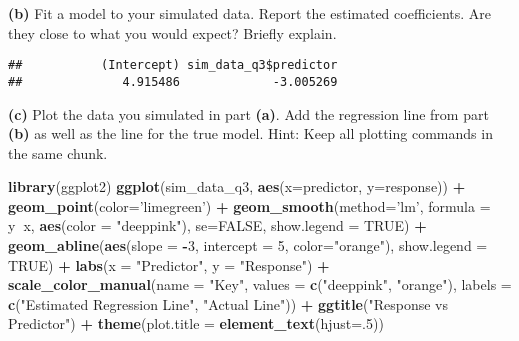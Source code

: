 \documentclass[]{article}
\newenvironment{Shaded}{\begin{snugshade}}{\end{snugshade}}
\newcommand{\KeywordTok}[1]{\textcolor[rgb]{0.13,0.29,0.53}{\textbf{#1}}}
\newcommand{\DataTypeTok}[1]{\textcolor[rgb]{0.13,0.29,0.53}{#1}}
\newcommand{\DecValTok}[1]{\textcolor[rgb]{0.00,0.00,0.81}{#1}}
\newcommand{\StringTok}[1]{\textcolor[rgb]{0.31,0.60,0.02}{#1}}
\newcommand{\OtherTok}[1]{\textcolor[rgb]{0.56,0.35,0.01}{#1}}
\newcommand{\OperatorTok}[1]{\textcolor[rgb]{0.81,0.36,0.00}{\textbf{#1}}}
\newcommand{\NormalTok}[1]{#1}
\begin{document}
\textbf{(b)} Fit a model to your simulated data. Report the estimated
coefficients. Are they close to what you would expect? Briefly explain.

\begin{Shaded}
\end{Shaded}

\begin{verbatim}
##           (Intercept) sim_data_q3$predictor 
##              4.915486             -3.005269
\end{verbatim}

\textbf{(c)} Plot the data you simulated in part \textbf{(a)}. Add the
regression line from part \textbf{(b)} as well as the line for the true
model. Hint: Keep all plotting commands in the same chunk.

\begin{Shaded}
\begin{Highlighting}[]
\KeywordTok{library}\NormalTok{(ggplot2)}
\KeywordTok{ggplot}\NormalTok{(sim_data_q3, }\KeywordTok{aes}\NormalTok{(}\DataTypeTok{x=}\NormalTok{predictor, }\DataTypeTok{y=}\NormalTok{response)) }\OperatorTok{+}\StringTok{ }\KeywordTok{geom_point}\NormalTok{(}\DataTypeTok{color=}\StringTok{'limegreen'}\NormalTok{) }\OperatorTok{+}\StringTok{ }\KeywordTok{geom_smooth}\NormalTok{(}\DataTypeTok{method=}\StringTok{'lm'}\NormalTok{, }\DataTypeTok{formula =}\NormalTok{ y}\OperatorTok{~}\NormalTok{x, }\KeywordTok{aes}\NormalTok{(}\DataTypeTok{color =} \StringTok{"deeppink"}\NormalTok{), }\DataTypeTok{se=}\OtherTok{FALSE}\NormalTok{, }\DataTypeTok{show.legend =} \OtherTok{TRUE}\NormalTok{) }\OperatorTok{+}\StringTok{ }\KeywordTok{geom_abline}\NormalTok{(}\KeywordTok{aes}\NormalTok{(}\DataTypeTok{slope =} \OperatorTok{-}\DecValTok{3}\NormalTok{, }\DataTypeTok{intercept =} \DecValTok{5}\NormalTok{, }\DataTypeTok{color=}\StringTok{"orange"}\NormalTok{), }\DataTypeTok{show.legend =} \OtherTok{TRUE}\NormalTok{) }\OperatorTok{+}\StringTok{ }\KeywordTok{labs}\NormalTok{(}\DataTypeTok{x =} \StringTok{"Predictor"}\NormalTok{, }\DataTypeTok{y =} \StringTok{"Response"}\NormalTok{) }\OperatorTok{+}\StringTok{ }\KeywordTok{scale_color_manual}\NormalTok{(}\DataTypeTok{name =} \StringTok{"Key"}\NormalTok{, }\DataTypeTok{values =} \KeywordTok{c}\NormalTok{(}\StringTok{"deeppink"}\NormalTok{, }\StringTok{"orange"}\NormalTok{), }\DataTypeTok{labels =} \KeywordTok{c}\NormalTok{(}\StringTok{"Estimated Regression Line"}\NormalTok{, }\StringTok{"Actual Line"}\NormalTok{)) }\OperatorTok{+}\StringTok{ }\KeywordTok{ggtitle}\NormalTok{(}\StringTok{"Response vs Predictor"}\NormalTok{) }\OperatorTok{+}\StringTok{ }\KeywordTok{theme}\NormalTok{(}\DataTypeTok{plot.title =} \KeywordTok{element_text}\NormalTok{(}\DataTypeTok{hjust=}\NormalTok{.}\DecValTok{5}\NormalTok{))}
\end{Highlighting}
\end{Shaded}
\end{document}
